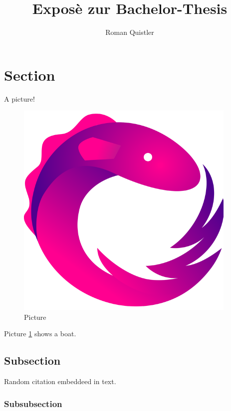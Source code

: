 \documentclass[11pt]{scrartcl}
\title{Exposè zur Bachelor-Thesis}
\author{Roman Quistler}
\begin{document}
	
	\maketitle
	\newpage
	\tableofcontents
	\newpage
	
	
	\section{Section}
	\label{sec:einleitende-worte}
	
	A picture!

	\begin{figure}[h!]
		\includegraphics[width=\linewidth]{images/rxjava.png}
		\caption{Picture}
		\label{pic:pic1}
	\end{figure}
	
	Picture \ref{pic:pic1} shows a boat.

	\subsection{Subsection}
	
	Random citation \autocite[1]{DUMMY:1} embeddeed in text.
	
	\subsubsection{Subsubsection}
	
\end{document}
